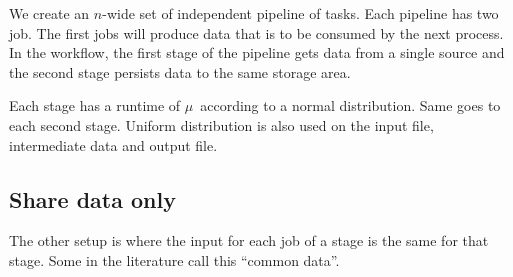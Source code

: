 \documentclass{article}
\begin{document}

We create an $n$-wide set of independent pipeline of tasks.  Each pipeline has
two job.  The first jobs will produce data that is to be consumed by the next
process.  In the workflow, the first stage of the pipeline gets data from a
single source and the second stage persists data to the same storage area.

Each stage has a runtime of $\mu$~\second according to a normal distribution.
Same goes to each second stage.  Uniform distribution is also used on the input
file, intermediate data and output file.

\subsection{Share data only} %
\label{sub:shared_data_only}

The other setup is where the input for each job of a stage is the same for that
stage.  Some in the literature call this ``common data''.


\end{document}
